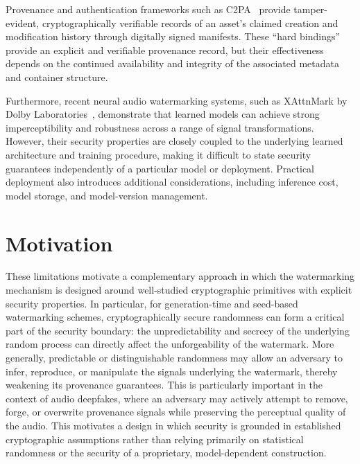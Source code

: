 Provenance and authentication frameworks such as C2PA~\cite{C2PA2025} provide tamper-evident, cryptographically verifiable records of an asset's claimed creation and modification history through digitally signed manifests.
These ``hard bindings'' provide an explicit and verifiable provenance record, but their effectiveness depends on the continued availability and integrity of the associated metadata and container structure.

Furthermore, recent neural audio watermarking systems, such as XAttnMark by Dolby Laboratories~\cite{Liu2025XAttn}, demonstrate that learned models can achieve strong imperceptibility and robustness across a range of signal transformations.
However, their security properties are closely coupled to the underlying learned architecture and training procedure, making it difficult to state security guarantees independently of a particular model or deployment.
Practical deployment also introduces additional considerations, including inference cost, model storage, and model-version management.

\section{Motivation}
These limitations motivate a complementary approach in which the watermarking mechanism is designed around well-studied cryptographic primitives with explicit security properties.
In particular, for generation-time and seed-based watermarking schemes, cryptographically secure randomness can form a critical part of the security boundary: the unpredictability and secrecy of the underlying random process can directly affect the unforgeability of the watermark.
More generally, predictable or distinguishable randomness may allow an adversary to infer, reproduce, or manipulate the signals underlying the watermark, thereby weakening its provenance guarantees. This is particularly important in the context of audio deepfakes, where an adversary may actively attempt to remove, forge, or overwrite provenance signals while preserving the perceptual quality of the audio.
This motivates a design in which security is grounded in established cryptographic assumptions rather than relying primarily on statistical randomness or the security of a proprietary, model-dependent construction.

